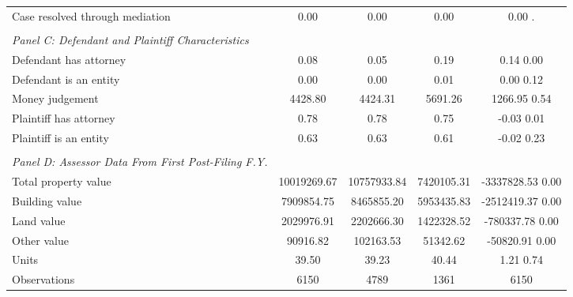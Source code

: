 \begin{table}[htbp]
\begin{tabular}{l*{4}{c}}
\hspace{0.25cm}Case resolved through mediation&      0.00  &      0.00  &      0.00  &      0.00 .\\
\vspace{0.1em} \\ \emph{Panel C: Defendant and Plaintiff Characteristics}&            &            &            &            \\
\hspace{0.25cm}Defendant has attorney&      0.08  &      0.05  &      0.19  &   0.14 0.00\\
\hspace{0.25cm}Defendant is an entity&      0.00  &      0.00  &      0.01  &   0.00 0.12\\
\hspace{0.25cm}Money judgement&   4428.80  &   4424.31  &   5691.26  & 1266.95 0.54\\
\hspace{0.25cm}Plaintiff has attorney&      0.78  &      0.78  &      0.75  &  -0.03 0.01\\
\hspace{0.25cm}Plaintiff is an entity&      0.63  &      0.63  &      0.61  &  -0.02 0.23\\
\vspace{0.1em} \\ \emph{Panel D: Assessor Data From First Post-Filing F.Y.}&            &            &            &            \\
\hspace{0.25cm}Total property value&10019269.67  &10757933.84  &7420105.31  & -3337828.53 0.00\\
\hspace{0.25cm}Building value&7909854.75  &8465855.20  &5953435.83  & -2512419.37 0.00\\
\hspace{0.25cm}Land value&2029976.91  &2202666.30  &1422328.52  & -780337.78 0.00\\
\hspace{0.25cm}Other value&  90916.82  & 102163.53  &  51342.62  & -50820.91 0.00\\
\hspace{0.25cm}Units&     39.50  &     39.23  &     40.44  &   1.21 0.74\\
\midrule
Observations        &        6150&        4789&        1361&        6150\\
\bottomrule
\end{tabular}
\end{table}
